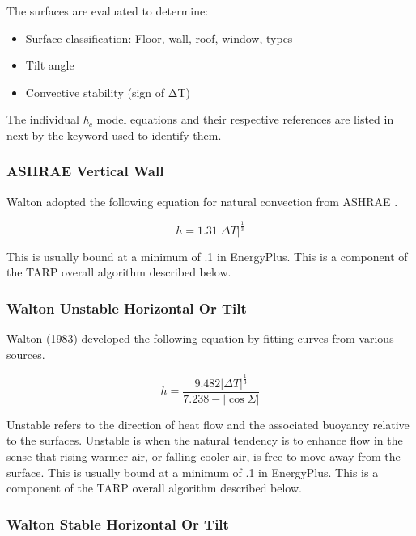 The surfaces are evaluated to determine:

\begin{itemize}
\item
  Surface classification: Floor, wall, roof, window, types
\item
  Tilt angle
\item
  Convective stability (sign of ΔT)
\end{itemize}

The individual \emph{h\(_{c}\)} model equations and their respective references are listed in next by the keyword used to identify them.

\subsubsection{ASHRAE Vertical Wall}\label{ashrae-vertical-wall}

Walton adopted the following equation for natural convection from ASHRAE .

\begin{equation}
h = 1.31{\left| {\Delta T} \right|^{\frac{1}{3}}}
\end{equation}

This is usually bound at a minimum of .1 in EnergyPlus. This is a component of the TARP overall algorithm described below.

\subsubsection{Walton Unstable Horizontal Or Tilt}\label{walton-unstable-horizontal-or-tilt}

Walton (1983) developed the following equation by fitting curves from various sources.

\begin{equation}
h = \frac{{9.482{{\left| {\Delta T} \right|}^{\frac{1}{3}}}}}{{7.238 - \left| {\cos \Sigma } \right|}}
\end{equation}

Unstable refers to the direction of heat flow and the associated buoyancy relative to the surfaces. Unstable is when the natural tendency is to enhance flow in the sense that rising warmer air, or falling cooler air, is free to move away from the surface. This is usually bound at a minimum of .1 in EnergyPlus. This is a component of the TARP overall algorithm described below.

\subsubsection{Walton Stable Horizontal Or Tilt}\label{walton-stable-horizontal-or-tilt}


